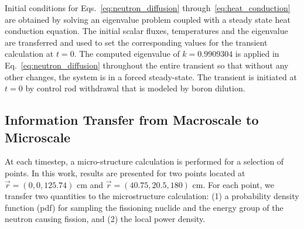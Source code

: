 \documentclass{anstrans}
\begin{document}
Initial conditions for Eqs.~\eqref{eq:neutron_diffusion} through~\eqref{eq:heat_conduction} are obtained by solving an eigenvalue problem coupled with a steady state heat conduction equation. The initial scalar fluxes, temperatures and the eigenvalue are transferred and used to set the corresponding values for the transient calculation at $t=0$.
The computed eigenvalue of $k=0.9909304$ is applied in Eq.~\eqref{eq:neutron_diffusion} throughout the entire transient so that without any other changes, the system is in a forced steady-state. The transient is initiated at $t=0$ by control rod withdrawal that is modeled by boron dilution.

\subsection{Information Transfer from Macroscale to Microscale}
At each timestep, a micro-structure calculation is performed for a selection of points. In this work, results are presented for two points located at $\vec{r} = (0, 0, 125.74)$ cm and $\vec{r} = (40.75, 20.5, 180)$ cm. For each point, we transfer two quantities to the
microstructure calculation: (1) a probability density function (pdf) for sampling the fissioning nuclide and the energy group of the neutron causing fission, and (2) the local power density.
\end{document}
